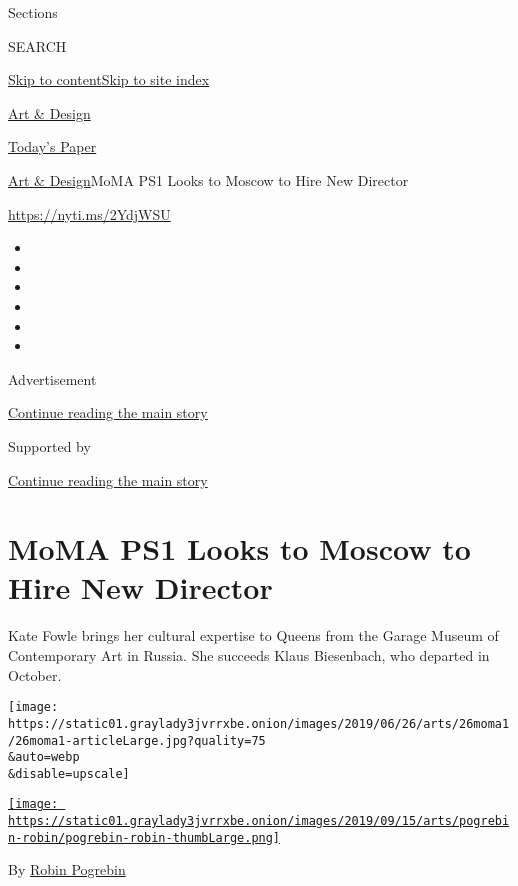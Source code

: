 Sections

SEARCH

\protect\hyperlink{site-content}{Skip to
content}\protect\hyperlink{site-index}{Skip to site index}

\href{https://www.nytimes3xbfgragh.onion/section/arts/design}{Art \&
Design}

\href{https://myaccount.nytimes3xbfgragh.onion/auth/login?response_type=cookie\&client_id=vi}{}

\href{https://www.nytimes3xbfgragh.onion/section/todayspaper}{Today's
Paper}

\href{/section/arts/design}{Art \& Design}\textbar{}MoMA PS1 Looks to
Moscow to Hire New Director

\url{https://nyti.ms/2YdjWSU}

\begin{itemize}
\item
\item
\item
\item
\item
\item
\end{itemize}

Advertisement

\protect\hyperlink{after-top}{Continue reading the main story}

Supported by

\protect\hyperlink{after-sponsor}{Continue reading the main story}

\hypertarget{moma-ps1-looks-to-moscow-to-hire-new-director}{%
\section{MoMA PS1 Looks to Moscow to Hire New
Director}\label{moma-ps1-looks-to-moscow-to-hire-new-director}}

Kate Fowle brings her cultural expertise to Queens from the Garage
Museum of Contemporary Art in Russia. She succeeds Klaus Biesenbach, who
departed in October.

\texttt{[image: https://static01.graylady3jvrrxbe.onion/images/2019/06/26/arts/26moma1/26moma1-articleLarge.jpg?quality=75\\\&auto=webp\\\&disable=upscale]}

\href{https://www.nytimes3xbfgragh.onion/by/robin-pogrebin}{\texttt{[image: https://static01.graylady3jvrrxbe.onion/images/2019/09/15/arts/pogrebin-robin/pogrebin-robin-thumbLarge.png]}}

By \href{https://www.nytimes3xbfgragh.onion/by/robin-pogrebin}{Robin
Pogrebin}


